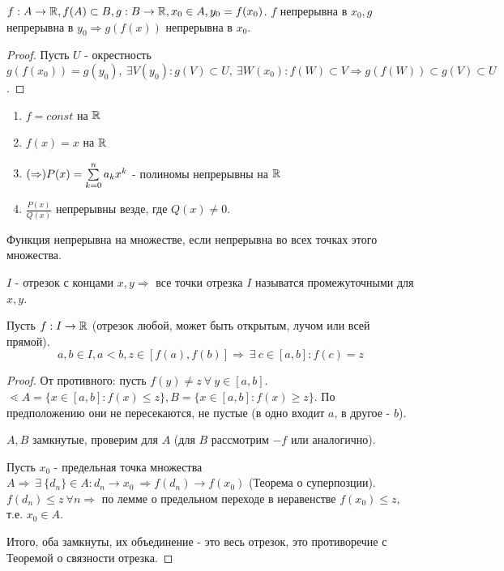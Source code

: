 \documentclass[12pt]{report}
\begin{document}
\begin{thm}
$f: A \to \mathbb{R}, f(A) \subset B, g: B \to \mathbb{R}, x_0 \in A, y_0 = f(x_0)$. $f$ непрерывна в $x_0, g$ непрерывна в $y_0 \Rightarrow g(f(x))$ непрерывна в $x_0$.
\end{thm}
\begin{proof}
Пусть $U$ - окрестность $g(f(x_0)) = g(y_0), ~\exists V(y_0): g(V) \subset U, ~\exists W(x_0): f(W) \subset V \Rightarrow g(f(W)) \subset g(V) \subset U$.
\end{proof}

\begin{ex}
\begin{enumerate}
\item $f = const$ на $\mathbb{R}$
\item $f(x) = x$ на $\mathbb{R}$
\item $(\Rightarrow) P(x) = \sum\limits_{k = 0}^n{a_kx^k}$ - полиномы непрерывны на $\mathbb{R}$
\item $\frac{P(x)}{Q(x)}$ непрерывны везде, где $Q(x) \neq 0$.
\end{enumerate}
\end{ex}

\begin{note}
Функция непрерывна на множестве, если непрерывна во всех точках этого множества.
\end{note}

\begin{defn}
$I$ - отрезок с концами $x, y \Rightarrow $ все точки отрезка $I$ называтся промежуточными для $x, y$.
\end{defn}

\begin{thm}
Пусть $f: I \to \mathbb{R}$ (отрезок любой, может быть открытым, лучом или всей прямой). 
$$a, b \in I, a < b, z \in [f(a), f(b)] \Rightarrow ~\exists  ~c \in [a, b]: f(c) = z$$
\end{thm}
\begin{proof}
От противного: пусть $f(y) \neq z ~\forall ~y \in [a, b]$. $\lessdot A = \{x \in [a, b]: f(x) \le z\}, B = \{x \in [a, b]: f(x) \ge z\} $. По предположению они не пересекаются, не пустые (в одно входит $a$, в другое - $b$).

$A, B$ замкнутые, проверим для $A$ (для $B$ рассмотрим $-f$ или аналогично).

Пусть $x_0$ - предельная точка множества $A \Rightarrow ~\exists ~\{d_n\} \in A: d_n \to x_0 ~\Rightarrow f(d_n) \to f(x_0)$ (Теорема о суперпозции). $f(d_n) \le z ~\forall n \Rightarrow$ по лемме о предельном переходе в неравенстве $f(x_0) \le z,$ т.е. $x_0 \in A$.

Итого, оба замкнуты, их объединение - это весь отрезок, это противоречие с Теоремой о связности отрезка.
\end{proof}
\end{document}
